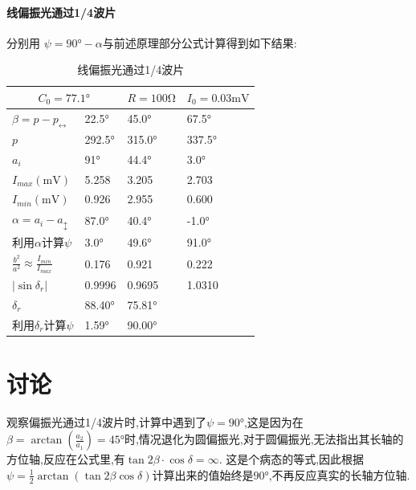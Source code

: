 \documentclass[UTF8,a4paper]{article}%
\begin{document}
\paragraph{线偏振光通过1/4波片}
分别用 $\psi=\ang{90}-\alpha$与前述原理部分公式计算得到如下结果:
\begin{table}[H]
    \centering
    \caption{线偏振光通过1/4波片}
    \begin{tabular}{llll}
        \hline
        \multicolumn{2}{c}{$C_0=\ang{77.1}$}            & $R=100\unit{\ohm} $ & $I_0=0.03\unit{\mV}$               \\
        \hline
        $\beta=p-p_\leftrightarrow$                     & \ang{22.5}          & \ang{45.0}           & \ang{67.5}  \\
        $p$                                             & \ang{292.5}         & \ang{315.0}          & \ang{337.5} \\
        $a_i$                                           & \ang{91}            & \ang{44.4}           & \ang{3.0}   \\
        $I_{max}(\unit{\mV})$                           & 5.258               & 3.205                & 2.703       \\
        $I_{min}(\unit{\mV})$                           & 0.926               & 2.955                & 0.600       \\
        $\alpha=a_i-a_\updownarrow$                     & \ang{87.0}          & \ang{40.4}           & \ang{-1.0}  \\
        利用$\alpha$计算$\psi$                              & \ang{3.0}           & \ang{49.6}           & \ang{91.0}  \\
        $\frac{b^2}{a^2}\approx\frac{I_{min}}{I_{max}}$ & 0.176               & 0.921                & 0.222       \\
        $|\sin\delta_r|$                                & 0.9996              & 0.9695               & 1.0310      \\
        $\delta_r$                                      & \ang{88.40}         & \ang{75.81}          &             \\
        利用$\delta_r$计算$\psi$                            & \ang{1.59}          & \ang{90.00}          &             \\
        \hline
    \end{tabular}
\end{table}
\section{讨论}
观察偏振光通过1/4波片时,计算中遇到了$\psi=\ang{90}$,这是因为在$\beta=\arctan(\frac{a_2}{a_1})=\ang{45}$时,情况退化为圆偏振光,对于圆偏振光,无法指出其长轴的方位轴,反应在公式里,有$\tan2\beta \cdot\cos\delta=\infty$. 这是个病态的等式,因此根据$\psi=\frac{1}{2}\arctan(\tan2\beta\cos\delta)$计算出来的值始终是$\ang{90}$,不再反应真实的长轴方位轴.
\end{document}
